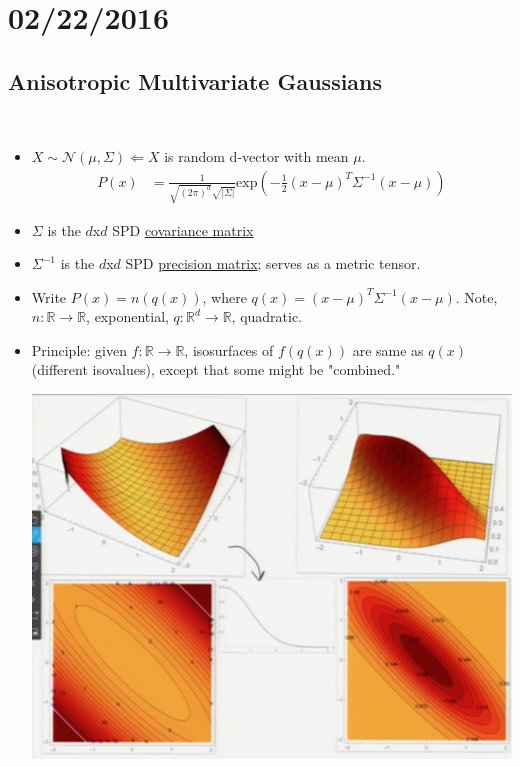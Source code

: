 \documentclass[10pt]{article}
\begin{document}
\section*{02/22/2016}
	\subsection*{Anisotropic Multivariate Gaussians}
		\
		\begin{itemize}
			\item $X \sim \mathcal{N}(\mu, \Sigma) \Leftarrow X$ is random d-vector with mean $\mu$.
				\begin{align*}
					P(x) &= \frac{1}{\sqrt{(2\pi)^{d}}\sqrt{|\Sigma|}}\text{exp}(-\frac{1}{2}(x-\mu)^{T}\Sigma^{-1}(x-\mu))
				\end{align*}
			\item $\Sigma$ is the $d$x$d$ SPD \underline{covariance matrix}
			\item $\Sigma^{-1}$ is the $d$x$d$ SPD \underline{precision matrix}; serves as a metric tensor.
			\item Write $P(x) = n(q(x))$, where $q(x) = (x-\mu)^{T}\Sigma^{-1}(x-\mu)$. Note, $n: \mathbb{R} \rightarrow \mathbb{R}$, exponential, $q: \mathbb{R}^{d} \rightarrow \mathbb{R}$, quadratic.
			\item Principle: given $f: \mathbb{R} \rightarrow \mathbb{R}$, isosurfaces of $f(q(x))$ are same as $q(x)$ (different isovalues), except that some might be "combined."
				\begin{center}
					\includegraphics[scale=0.5]{../images/gaussiantransformation}
				\end{center}

\end{itemize}
\end{document}
